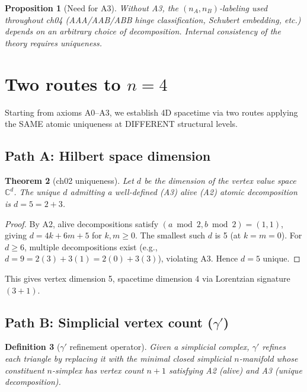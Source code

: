 \documentclass[11pt]{article}
\newtheorem{theorem}{Theorem}
\newtheorem{definition}[theorem]{Definition}
\newtheorem{proposition}[theorem]{Proposition}
\begin{document}
\begin{proposition}[Need for A3]
Without A3, the $(n_A, n_B)$-labeling used throughout ch04
(AAA/AAB/ABB hinge classification, Schubert embedding, etc.)
depends on an arbitrary choice of decomposition. Internal
consistency of the theory requires uniqueness.
\end{proposition}

\section{Two routes to $n = 4$}

Starting from axioms A0--A3, we establish 4D spacetime via two
routes applying the SAME atomic uniqueness at DIFFERENT structural
levels.

\subsection{Path A: Hilbert space dimension}

\begin{theorem}[ch02 uniqueness]
\label{thm:pathA}
Let $d$ be the dimension of the vertex value space $\mathbb{C}^d$.
The unique $d$ admitting a well-defined (A3) alive (A2) atomic
decomposition is $d = 5 = 2 + 3$.
\end{theorem}

\begin{proof}
By A2, alive decompositions satisfy $(a \bmod 2, b \bmod 2) = (1, 1)$,
giving $d = 4k + 6m + 5$ for $k, m \geq 0$.
The smallest such $d$ is 5 (at $k = m = 0$). For $d \geq 6$, multiple
decompositions exist (e.g., $d = 9 = 2(3) + 3(1) = 2(0) + 3(3)$),
violating A3. Hence $d = 5$ unique.
\end{proof}

This gives vertex dimension 5, spacetime dimension 4 via Lorentzian
signature $(3+1)$.

\subsection{Path B: Simplicial vertex count ($\gamma'$)}

\begin{definition}[$\gamma'$ refinement operator]
\label{def:gammaprime}
Given a simplicial complex, $\gamma'$ refines each triangle by
replacing it with the minimal closed simplicial $n$-manifold
whose constituent $n$-simplex has vertex count $n+1$ satisfying
A2 (alive) and A3 (unique decomposition).
\end{definition}
\end{document}
